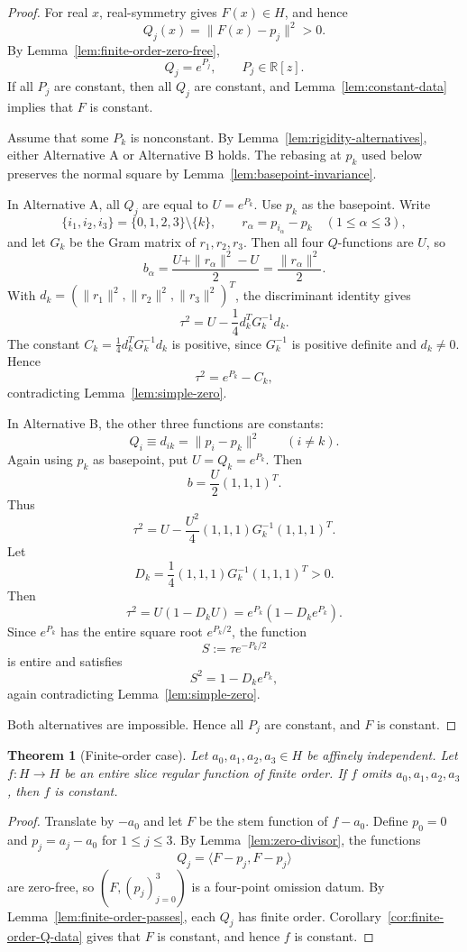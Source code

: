 \documentclass[11pt]{amsart}
\def\HH{H}%
\numberwithin{equation}{section}
\newtheorem{theorem}{Theorem}[section]
\theoremstyle{definition}
\theoremstyle{remark}
\newcommand{\HH}{\mathbb H}
\newcommand{\RR}{\mathbb R}
\begin{document}
\begin{proof}
For real $x$, real-symmetry gives $F(x)\in\HH$, and hence
\[
Q_j(x)=\|F(x)-p_j\|^2>0.
\]
By Lemma~\ref{lem:finite-order-zero-free},
\[
Q_j=e^{P_j},\qquad P_j\in\RR[z].
\]
If all $P_j$ are constant, then all $Q_j$ are constant, and Lemma~\ref{lem:constant-data} implies that $F$ is constant.

Assume that some $P_k$ is nonconstant. By Lemma~\ref{lem:rigidity-alternatives}, either Alternative A or Alternative B holds.  The rebasing at $p_k$ used below preserves the normal square by Lemma~\ref{lem:basepoint-invariance}.

In Alternative A, all $Q_j$ are equal to $U=e^{P_k}$. Use $p_k$ as the basepoint. Write
\[
\{i_1,i_2,i_3\}=\{0,1,2,3\}\setminus\{k\},\qquad
r_\alpha=p_{i_\alpha}-p_k\quad(1\le \alpha\le3),
\]
and let $G_k$ be the Gram matrix of $r_1,r_2,r_3$. Then all four $Q$-functions are $U$, so
\[
b_\alpha=\frac{U+\|r_\alpha\|^2-U}{2}=\frac{\|r_\alpha\|^2}{2}.
\]
With $d_k=(\|r_1\|^2,\|r_2\|^2,\|r_3\|^2)^T$, the discriminant identity gives
\[
\tau^2=U-\frac14d_k^TG_k^{-1}d_k.
\]
The constant $C_k=\frac14d_k^TG_k^{-1}d_k$ is positive, since $G_k^{-1}$ is positive definite and $d_k\neq0$. Hence
\[
\tau^2=e^{P_k}-C_k,
\]
contradicting Lemma~\ref{lem:simple-zero}.

In Alternative B, the other three functions are constants:
\[
Q_i\equiv d_{ik}=\|p_i-p_k\|^2\qquad (i\neq k).
\]
Again using $p_k$ as basepoint, put $U=Q_k=e^{P_k}$. Then
\[
b=\frac U2(1,1,1)^T.
\]
Thus
\[
\tau^2=U-\frac{U^2}{4}(1,1,1)G_k^{-1}(1,1,1)^T.
\]
Let
\[
D_k=\frac14(1,1,1)G_k^{-1}(1,1,1)^T>0.
\]
Then
\[
\tau^2=U(1-D_kU)=e^{P_k}(1-D_ke^{P_k}).
\]
Since $e^{P_k}$ has the entire square root $e^{P_k/2}$, the function
\[
S:=\tau e^{-P_k/2}
\]
is entire and satisfies
\[
S^2=1-D_ke^{P_k},
\]
again contradicting Lemma~\ref{lem:simple-zero}.

Both alternatives are impossible. Hence all $P_j$ are constant, and $F$ is constant.
\end{proof}

\begin{theorem}[Finite-order case]\label{thm:finite-order}
Let $a_0,a_1,a_2,a_3\in\HH$ be affinely independent. Let $f:\HH\to\HH$ be an entire slice regular function of finite order. If $f$ omits $a_0,a_1,a_2,a_3$, then $f$ is constant.
\end{theorem}

\begin{proof}
Translate by $-a_0$ and let $F$ be the stem function of $f-a_0$. Define $p_0=0$ and $p_j=a_j-a_0$ for $1\le j\le3$.  By Lemma~\ref{lem:zero-divisor}, the functions
\[
Q_j=\langle F-p_j,F-p_j\rangle
\]
are zero-free, so $(F,(p_j)_{j=0}^3)$ is a four-point omission datum.  By Lemma~\ref{lem:finite-order-passes}, each $Q_j$ has finite order.  Corollary~\ref{cor:finite-order-Q-data} gives that $F$ is constant, and hence $f$ is constant.
\end{proof}
\end{document}
